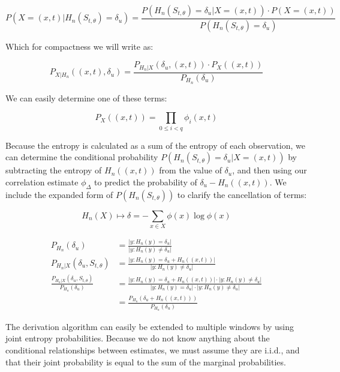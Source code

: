 \documentclass[10pt]{article}
\begin{document}
\[ P \left( X = (x,t) | H_n(S_{t,\theta}) = \delta_u \right) = \frac { P \left( H_n( S_{t,\theta} ) = \delta_u | X = (x,t) \right) \cdot P \left( X = (x,t) \right) } { P \left( H_n( S_{t,\theta} ) = \delta_u \right) } \]

Which for compactness we will write as:

\begin{equation} P_{X|H_n} \left( (x,t), \delta_u \right) = \frac { P_{H_n|X} \left( \delta_u, (x,t) \right) \cdot P_X \left( (x,t) \right) } { P_{H_n} \left( \delta_u \right) } \end{equation}

We can easily determine one of these terms:

\begin{equation} P_X \left( (x,t) \right) = \prod_{0 \le i < q} \phi_i(x,t) \end{equation}

Because the entropy is calculated as a sum of the entropy of each observation, we can determine the conditional probability \( P \left( H_n(S_{t,\theta}) = \delta_u | X = (x,t) \right) \) by subtracting the entropy of \(H_n((x,t)) \) from the value of \(\delta_u \), and then using our correlation estimate \(\phi_\Delta \) to predict the probability of \(\delta_u - H_n((x,t)) \).  We include the expanded form of \(P( H_n(S_{t,\theta}) ) \) to clarify the cancellation of terms:

\[ H_n(X) \mapsto \delta= -\sum_{x \in X} \phi(x) \log \phi(x) \]

\begin{align*}
P_{H_n} \left( \delta_u \right) &= \frac{ | y : H_n(y) = \delta_u | }{ | y : H_n(y) \ne \delta_u | } \\
P_{H_n |X} \left( \delta_u, S_{t,\theta} \right) &= \frac{ | y : H_n(y) = \delta_u + H_n \left( (x,t) \right) | }{ | y : H_n (y) \ne \delta_u | } \\
\frac{ P_{H_n |X} \left( \delta_u, S_{t,\theta} \right) }{ P_{H_n}( \delta_u ) } &= \frac{ | y : H_n(y) = \delta_u + H_n \left( (x,t) \right) | \cdot | y : H_n(y) \ne \delta_u | }
{ | y : H_n(y) = \delta_u | \cdot | y : H_n(y) \ne \delta_u | } \\
&= \frac{ P_{H_n} \left( \delta_u + H_n \left( (x,t) \right) \right) }{ P_{H_n} \left( \delta_u \right) } 
\end{align*}

The derivation algorithm can easily be extended to multiple windows by using joint entropy probabilities.  Because we do not know anything about the conditional relationships between estimates, we must assume they are i.i.d., and that their joint probability is equal to the sum of the marginal probabilities.
\end{document}
